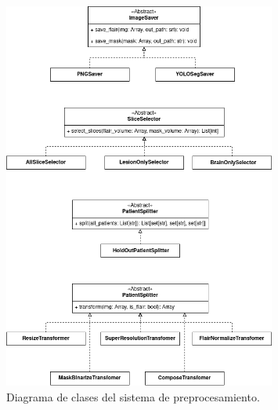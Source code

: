 \documentclass[../main.tex]{subfiles}
\begin{document}
\begin{figure}
    \centering
    \includegraphics[width=0.8\textwidth]{imgs/impl/preprocess-diag-class.png}
    \caption{Diagrama de clases del sistema de preprocesamiento.}
    \label{fig:clases-preprocesamiento}
\end{figure}
\end{document}
